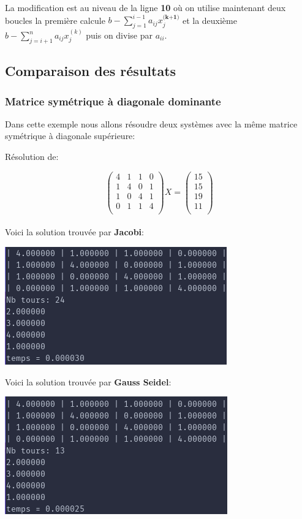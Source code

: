 \documentclass[a4paper]{article}
\begin{document}
La modification est au niveau de la ligne \textbf{10} où on utilise maintenant
deux boucles la première calcule $b - \sum_{j=1}^{i-1}a_{ij}x_{j}^{\textbf{(k+1)}}$
et la deuxième $b - \sum_{j=i+1}^{n}a_{ij}x_{j}^{(k)}$ puis on divise par $a_{ii}$.

\subsection{Comparaison des résultats}

\subsubsection{Matrice symétrique à diagonale dominante}

Dans cette exemple nous allons résoudre deux systèmes avec la même matrice
symétrique à diagonale supérieure:

Résolution de:

\[
\begin{pmatrix}
  4 & 1 & 1 & 0\\
  1 & 4 & 0 & 1\\
  1 & 0 & 4 & 1\\
  0 & 1 & 1 & 4\\
\end{pmatrix} X =
\begin{pmatrix}
  15\\
  15\\
  19\\
  11\\
\end{pmatrix}
\]\\

Voici la solution trouvée par \textbf{Jacobi}:

\includegraphics[scale=0.5]{./img/jacobi/jac_ex_1.png}

Voici la solution trouvée par \textbf{Gauss Seidel}:

\includegraphics[scale=0.5]{./img/gauss_seidel/g_e_ex_1.png}
\end{document}
